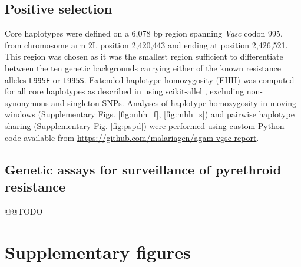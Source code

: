 \documentclass[a4paper,11pt,abstracton,hidelinks]{scrartcl}
\newcommand{\beginsupplement}{%
  \setcounter{table}{0}
  \renewcommand{\thetable}{S\arabic{table}}%
  \setcounter{figure}{0}
  \renewcommand{\thefigure}{S\arabic{figure}}%
}
\begin{document}
\subsection*{Positive selection}

Core haplotypes were defined on a 6,078 bp region spanning \textit{Vgsc} codon 995, from chromosome arm 2L position 2,420,443 and ending at position 2,426,521. 
%
This region was chosen as it was the smallest region sufficient to differentiate between the ten genetic backgrounds carrying either of the known resistance alleles \texttt{L995F} or \texttt{L995S}.
%
Extended haplotype homozygosity (EHH) was computed for all core haplotypes as described in \cite{Sabeti2002} using scikit-allel \cite{Miles2016}, excluding non-synonymous and singleton SNPs.
%
Analyses of haplotype homozygosity in moving windows (Supplementary Figs. \ref{fig:mhh_f}, \ref{fig:mhh_s}) and pairwise haplotype sharing (Supplementary Fig. \ref{fig:pspd}) were performed using custom Python code available from \url{https://github.com/malariagen/agam-vgsc-report}.
%

\subsection*{Genetic assays for surveillance of pyrethroid resistance}

@@TODO
%



\printbibliography

\beginsupplement
\section*{Supplementary figures}

\clearpage
\end{document}
